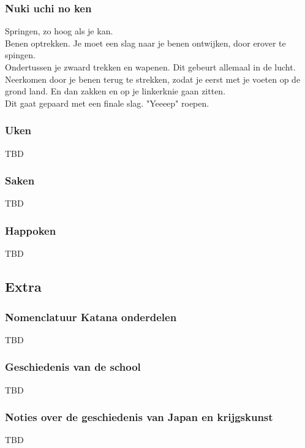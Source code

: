\subsubsection{Nuki uchi no ken}

\suwaristart
Springen, zo hoog als je kan.\\
Benen optrekken. Je moet een slag naar je benen ontwijken, door erover te spingen.\\
Ondertussen je zwaard trekken en wapenen. Dit gebeurt allemaal in de lucht.\\
Neerkomen door je benen terug te strekken, zodat je eerst met je voeten op de grond land. En dan zakken en op je linkerknie gaan zitten.\\
Dit gaat gepaard met een finale slag. "Yeeeep" roepen.\\
\suwaristop

\subsubsection{Uken}

\suwaristart
TBD

\subsubsection{Saken}

\suwaristart
TBD

\subsubsection{Happoken}

TBD

\subsection{Extra}

\subsubsection{Nomenclatuur Katana onderdelen}

TBD

\subsubsection{Geschiedenis van de school}

TBD

\subsubsection{Noties over de geschiedenis van Japan en krijgskunst}

TBD
